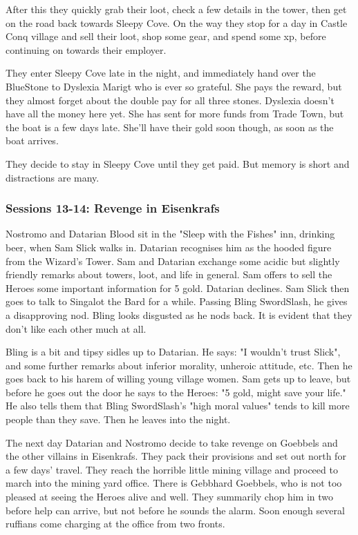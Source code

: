 After this they quickly grab their loot, check a few details in the tower, then get on the road back towards Sleepy Cove.
On the way they stop for a day in Castle Conq village and sell their loot, shop some gear, and spend some xp, before continuing on towards their employer.

They enter Sleepy Cove late in the night, and immediately hand over the BlueStone to Dyslexia Marigt who is ever so grateful. She pays the reward, but they almost forget about the double pay for all three stones. Dyslexia doesn't have all the money here yet. She has sent for more funds from Trade Town, but the boat is a few days late. She'll have their gold soon though, as soon as the boat arrives.

They decide to stay in Sleepy Cove until they get paid. But memory is short and distractions are many.


\subsubsection*{Sessions 13-14: Revenge in Eisenkrafs}
Nostromo and Datarian Blood sit in the "Sleep with the Fishes" inn, drinking beer, when Sam Slick walks in. Datarian recognises him as the hooded figure from the Wizard's Tower. Sam and Datarian exchange some acidic but slightly friendly remarks about towers, loot, and life in general. Sam offers to sell the Heroes some important information for 5 gold. Datarian declines.
Sam Slick then goes to talk to Singalot the Bard for a while. Passing Bling SwordSlash, he gives a disapproving nod. Bling looks disgusted as he nods back. It is evident that they don't like each other much at all.

Bling is a bit and tipsy sidles up to Datarian. He says: "I wouldn't trust Slick", and some further remarks about inferior morality, unheroic attitude, etc. Then he goes back to his harem of willing young village women.
Sam gets up to leave, but before he goes out the door he says to the Heroes: "5 gold, might save your life." He also tells them that Bling SwordSlash's "high moral values" tends to kill more people than they save. Then he leaves into the night.

The next day Datarian and Nostromo decide to take revenge on Goebbels and the other villains in Eisenkrafs. They pack their provisions and set out north for a few days' travel. They reach the horrible little mining village and proceed to march into the mining yard office. There is Gebbhard Goebbels, who is not too pleased at seeing the Heroes alive and well. They summarily chop him in two before help can arrive, but not before he sounds the alarm. Soon enough several ruffians come charging at the office from two fronts.

